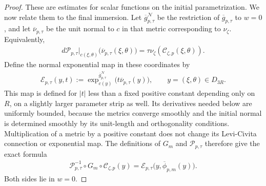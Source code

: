 \documentclass[a4paper,11pt,oneside,reqno]{amsart}
\numberwithin{equation}{section}
\theoremstyle{definition}
\begin{document}
\begin{proof}
    These are estimates for scalar functions on the initial
    parametrization. We now relate them to the final
    immersion. Let $\overline g^\mathcal N_{p,\tau}$ be the
    restriction of $\overline g_{p,\tau}$ to $w=0$, and let
    $\overline\nu_{p,\tau}$ be the unit normal to $c$ in that
    metric corresponding to $\nu_\zeta$. Equivalently,
    \begin{align*}
        d\mathcal P_{p,\tau}|_{c(\xi,\theta)}
          \bigl(\overline\nu_{p,\tau}(\xi,\theta)\bigr)
        =\tau\nu_\zeta(\mathcal C_{\zeta,p}(\xi,\theta)).
    \end{align*}
    Define the normal exponential map in these coordinates by
    \begin{align*}
        \mathcal E_{p,\tau}(y,t)
        :=\exp_{c(y)}^{\overline g^\mathcal N_{p,\tau}}
              \bigl(t\overline\nu_{p,\tau}(y)\bigr),
        \qquad y=(\xi,\theta)\in D_{3R}.
    \end{align*}
    This map is defined for $|t|$ less than a fixed positive
    constant depending only on $R$, on a slightly larger
    parameter strip as well. Its derivatives needed below
    are uniformly bounded, because the metrics converge
    smoothly and the initial normal is determined smoothly
    by its unit-length and orthogonality conditions.
    Multiplication of a metric by a positive constant does
    not change its Levi-Civita connection or exponential map.
    The definitions of $G_m$ and $\mathcal P_{p,\tau}$ therefore
    give the exact formula
    \begin{align*}
        \mathcal P_{p,\tau}^{-1}
          \circ G_m\circ\mathcal C_{\zeta,p}(y)
        =\mathcal E_{p,\tau}
           \bigl(y,\overline\phi_{p,m}(y)\bigr).
    \end{align*}
    Both sides lie in $w=0$.


\end{proof}
\end{document}
